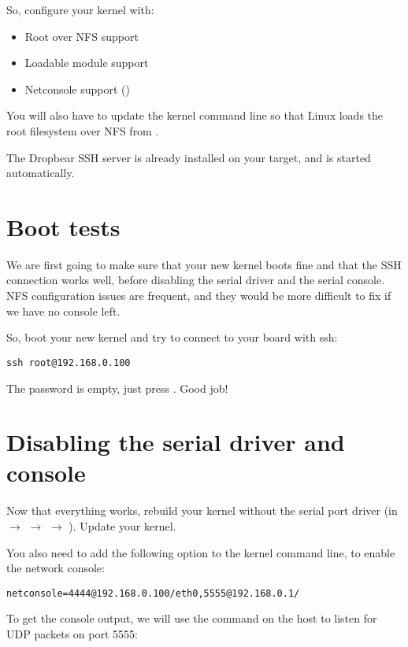 So, configure your kernel with:
\begin{itemize}
\item Root over NFS support
\item Loadable module support
\item Netconsole support ()
\end{itemize}

You will also have to update the kernel command line so that Linux
loads the root filesystem over NFS from
.

The Dropbear SSH server is already installed on your target, and is
started automatically.

\section{Boot tests}

We are first going to make sure that your new kernel boots fine and
that the SSH connection works well, before disabling the serial driver
and the serial console. NFS configuration issues are frequent, and
they would be more difficult to fix if we have no console left.

So, boot your new kernel and try to connect to your board with ssh:

\begin{verbatim}
ssh root@192.168.0.100
\end{verbatim}

The  password is empty, just press . Good job!

\section{Disabling the serial driver and console}

Now that everything works, rebuild your kernel without the serial port
driver (in  $\rightarrow$ 
$\rightarrow$  $\rightarrow$ ). Update your kernel.

You also need to add the following option to the kernel command line,
to enable the network console:

\begin{verbatim}
netconsole=4444@192.168.0.100/eth0,5555@192.168.0.1/
\end{verbatim}

To get the console output, we will use the  command on the host
to listen for UDP packets on port 5555:

